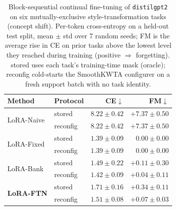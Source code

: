 \begin{table}[t]
\caption{Block-sequential continual fine-tuning of {\tt distilgpt2} on six mutually-exclusive style-transformation tasks (concept shift). Per-token cross-entropy on a held-out test split, mean $\pm$ std over 7 random seeds; FM is the average rise in CE on prior tasks above the lowest level they reached during training (positive $\Rightarrow$ forgetting). {\sc stored} uses each task's training-time mask (oracle); {\sc reconfig} cold-starts the SmoothKWTA configurer on a fresh support batch with no task identity.}
\label{tab:lora_styles}
\vskip 0.05in
\begin{center}\begin{small}\begin{sc}
\begin{tabular}{llrr}
\toprule
Method & Protocol & CE$\downarrow$ & FM$\downarrow$ \\
\midrule
\multirow{2}{*}{LoRA-Naive}
  & stored   & $8.22\pm0.42$ & $+7.37\pm0.50$ \\
  & reconfig & $8.22\pm0.42$ & $+7.37\pm0.50$ \\
\midrule
\multirow{2}{*}{LoRA-Fixed}
  & stored   & $1.39\pm0.09$ & $0.00\pm0.00$ \\
  & reconfig & $1.39\pm0.09$ & $0.00\pm0.00$ \\
\midrule
\multirow{2}{*}{LoRA-Bank}
  & stored   & $1.49\pm0.22$ & $+0.11\pm0.30$ \\
  & reconfig & $1.42\pm0.09$ & $+0.04\pm0.11$ \\
\midrule
\multirow{2}{*}{\textbf{LoRA-FTN}}
  & stored   & $1.71\pm0.16$ & $+0.34\pm0.11$ \\
  & reconfig & $1.51\pm0.08$ & $+0.07\pm0.03$ \\
\bottomrule
\end{tabular}
\end{sc}\end{small}\end{center}
\vskip -0.1in
\end{table}
